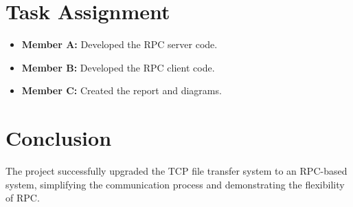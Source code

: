 \documentclass[a4paper,12pt]{article}
\begin{document}
\section{Task Assignment}
\begin{itemize}
    \item \textbf{Member A:} Developed the RPC server code.
    \item \textbf{Member B:} Developed the RPC client code.
    \item \textbf{Member C:} Created the report and diagrams.
\end{itemize}

\section{Conclusion}
The project successfully upgraded the TCP file transfer system to an RPC-based system, simplifying the communication process and demonstrating the flexibility of RPC.
\end{document}
